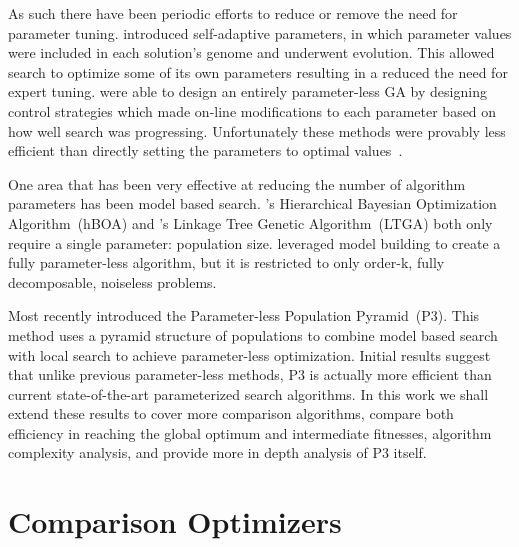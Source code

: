 \documentclass[twoside]{article}
\begin{document}
As such there have been periodic efforts to reduce or remove the need for parameter tuning.
\cite{Back:1992:selfadapt} introduced self-adaptive parameters, in which parameter values
were included in each solution's genome and underwent evolution. This allowed search
to optimize some of its own parameters resulting in a reduced the need for expert tuning.
\cite{harik:1999:parameterlessga} were able to design an entirely parameter-less GA by
designing control strategies which made on-line modifications to each parameter based
on how well search was progressing. Unfortunately these methods were provably less efficient
than directly setting the parameters to optimal values~\citep{pelikan:1999:worstparameter-less}.

One area that has been very effective at reducing the number of algorithm parameters has been
model based search. \cite{pelikan:2006:hboa}'s Hierarchical Bayesian Optimization
Algorithm~(hBOA) and \cite{thierens:2010:ltga}'s Linkage Tree Genetic Algorithm~(LTGA)
both only require a single parameter: population size. \cite{posik:2011:parameterless}
leveraged model building to create a fully parameter-less algorithm, but it is restricted to
only order-k, fully decomposable, noiseless problems.

Most recently \cite{goldman:2014:p3} introduced the Parameter-less Population Pyramid~(P3).
This method uses a pyramid structure of populations to combine model based search with local search
to achieve parameter-less optimization. Initial results suggest that unlike
previous parameter-less methods, P3 is actually more efficient than current state-of-the-art
parameterized search algorithms. In this work we shall extend these results to cover more
comparison algorithms, compare both efficiency in reaching the global optimum and intermediate
fitnesses, algorithm complexity analysis, and provide more in depth analysis of P3 itself.
\begin{comment}
Section~\ref{sec-optimizers}
explains how each of these algorithms, including P3, perform search. Section~\ref{sec-problems}
provides a description of each test problem. As hBOA and LTGA require a population size parameter
Section~\ref{sec-tuning} provides our methodology to ensure each is optimally tuned to each problem.
\end{comment}

\section{Comparison Optimizers}
\label{sec-optimizers}
\end{document}
